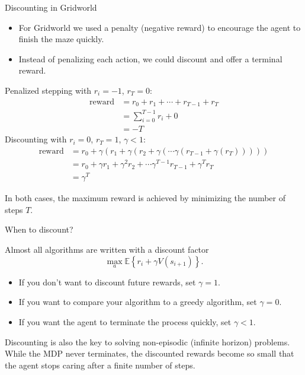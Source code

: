 \documentclass[9pt]{beamer}
\newcommand\pskip{\pause\bigskip}
\begin{document}
\begin{frame}{Discounting in Gridworld}
\begin{itemize}
	\item For Gridworld we used a penalty (negative reward) to encourage the agent to finish the maze quickly.
	\item Instead of penalizing each action, we could discount and offer a terminal reward.
\end{itemize}

\pause
Penalized stepping with $r_i=-1$, $r_T=0$:
\begin{align*}
	\text{reward} &= r_0 + r_1 + \cdots + r_{T-1} + r_T \\
		&= \sum_{i=0}^{T-1} r_i + 0 \\
		&= -T	
\end{align*}
\pause
Discounting with $r_i=0$, $r_T=1$, $\gamma < 1$:
\begin{align*}
	\text{reward} &= r_0 + \gamma(r_1 + \gamma(r_2 + \gamma(\cdots \gamma(r_{T-1} + \gamma (r_T))))) \\
		&= r_0 + \gamma r_1 + \gamma^2 r_2 + \cdots \gamma^{T-1} r_{T-1} + \gamma^T r_T \\
		&= \gamma^T
\end{align*}

\pause
In both cases, the maximum reward is achieved by minimizing the number of steps $T$.

\end{frame}

\begin{frame}{When to discount?}

Almost all algorithms are written with a discount factor
	\[ \max_{a} \mathbb{E}\left\{ r_i + \gamma V(s_{i+1}) \right\}. \]
	
\begin{itemize}
	\item If you don't want to discount future rewards, set $\gamma=1$.
	\item If you want to compare your algorithm to a greedy algorithm, set $\gamma=0$.
	\item If you want the agent to terminate the process quickly, set $\gamma<1$.
\end{itemize}

\pskip
Discounting is also the key to solving non-episodic (infinite horizon) problems. While the MDP never terminates, the discounted rewards become so small that the agent stops caring after a finite number of steps.

\end{frame}
\end{document}

